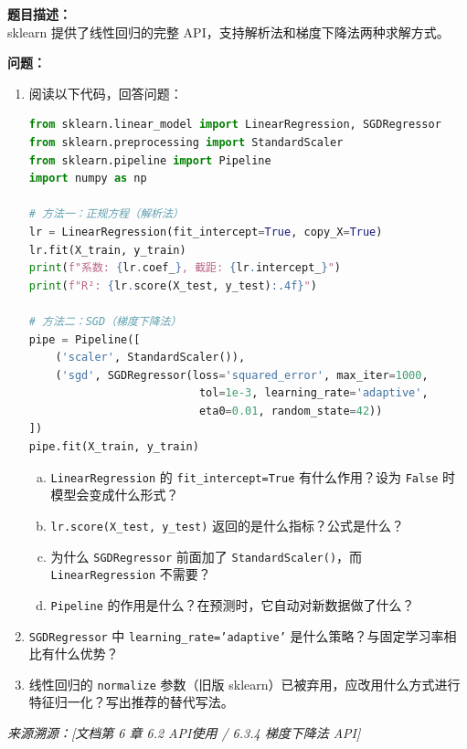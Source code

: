 \documentclass[a4paper,11pt]{ctexart}
\begin{document}
\begin{problembox}
    \textbf{题目描述：}\\
    sklearn 提供了线性回归的完整 API，支持解析法和梯度下降法两种求解方式。

    \vspace{0.2cm}
    \textbf{问题：}
    \begin{enumerate}[(1)]
        \item 阅读以下代码，回答问题：

        \begin{lstlisting}[language=Python]
from sklearn.linear_model import LinearRegression, SGDRegressor
from sklearn.preprocessing import StandardScaler
from sklearn.pipeline import Pipeline
import numpy as np

# 方法一：正规方程（解析法）
lr = LinearRegression(fit_intercept=True, copy_X=True)
lr.fit(X_train, y_train)
print(f"系数: {lr.coef_}, 截距: {lr.intercept_}")
print(f"R²: {lr.score(X_test, y_test):.4f}")

# 方法二：SGD（梯度下降法）
pipe = Pipeline([
    ('scaler', StandardScaler()),
    ('sgd', SGDRegressor(loss='squared_error', max_iter=1000,
                          tol=1e-3, learning_rate='adaptive',
                          eta0=0.01, random_state=42))
])
pipe.fit(X_train, y_train)
        \end{lstlisting}

        \begin{enumerate}[a.]
            \item \texttt{LinearRegression} 的 \texttt{fit\_intercept=True} 有什么作用？设为 \texttt{False} 时模型会变成什么形式？
            \item \texttt{lr.score(X\_test, y\_test)} 返回的是什么指标？公式是什么？
            \item 为什么 \texttt{SGDRegressor} 前面加了 \texttt{StandardScaler()}，而 \texttt{LinearRegression} 不需要？
            \item \texttt{Pipeline} 的作用是什么？在预测时，它自动对新数据做了什么？
        \end{enumerate}

        \item \texttt{SGDRegressor} 中 \texttt{learning\_rate='adaptive'} 是什么策略？与固定学习率相比有什么优势？

        \item 线性回归的 \texttt{normalize} 参数（旧版 sklearn）已被弃用，应改用什么方式进行特征归一化？写出推荐的替代写法。
    \end{enumerate}
    {\color{gray}\small\textit{来源溯源：[文档第 6 章 6.2 API使用 / 6.3.4 梯度下降法 API]}}
\end{problembox}
\end{document}
